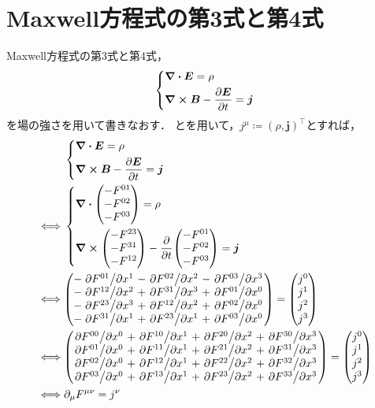 \documentclass{report}
\begin{document}
  \section{Maxwell方程式の第3式と第4式}
    Maxwell方程式の第3式と第4式，
    \begin{align}
      \begin{dcases}
        \div\bm{E} = \rho \\ 
        \curl\bm{B} - \pdv{\bm{E}}{t} = \bm{j} 
      \end{dcases}
    \end{align}
    を場の強さを用いて書きなおす．
    とを用いて，$j^{\mu} \coloneqq (\rho, \bm{j})^{\top}$とすれば，
    \begin{align}
      &\begin{dcases}
        \div\bm{E} = \rho \\ 
        \curl\bm{B} - \pdv{\bm{E}}{t} = \bm{j} 
      \end{dcases} \\ 
      \iff& \begin{dcases}
        \div\mqty(-F^{01} \\ -F^{02} \\ -F^{03}) = \rho \\ 
        \curl\mqty(-F^{23} \\ -F^{31} \\ -F^{12}) - \pdv{t}\mqty(-F^{01} \\ -F^{02} \\ -F^{03}) = \bm{j}
      \end{dcases} \\ 
      \iff& \mqty(
        -\pdv*{F^{01}}{x^1} - \pdv*{F^{02}}{x^2} - \pdv*{F^{03}}{x^3} \\ 
        -\pdv*{F^{12}}{x^2} + \pdv*{F^{31}}{x^3} + \pdv*{F^{01}}{x^0} \\ 
        -\pdv*{F^{23}}{x^3} + \pdv*{F^{12}}{x^2} + \pdv*{F^{02}}{x^0} \\ 
        -\pdv*{F^{31}}{x^1} + \pdv*{F^{23}}{x^1} + \pdv*{F^{03}}{x^0} \\ 
      ) = \mqty(j^0 \\ j^1 \\ j^2 \\ j^3) \\ 
      \iff& \mqty(
        \pdv*{F^{00}}{x^0} + \pdv*{F^{10}}{x^1} + \pdv*{F^{20}}{x^2} + \pdv*{F^{30}}{x^3} \\ 
        \pdv*{F^{01}}{x^0} + \pdv*{F^{11}}{x^1} + \pdv*{F^{21}}{x^2} + \pdv*{F^{31}}{x^3} \\ 
        \pdv*{F^{02}}{x^0} + \pdv*{F^{12}}{x^1} + \pdv*{F^{22}}{x^2} + \pdv*{F^{32}}{x^3} \\ 
        \pdv*{F^{03}}{x^0} + \pdv*{F^{13}}{x^1} + \pdv*{F^{23}}{x^2} + \pdv*{F^{33}}{x^3} \\ 
      ) = \mqty(j^0 \\ j^1 \\ j^2 \\ j^3) \\ 
      \iff& \partial_{\mu}F^{\mu\nu} = j^{\nu} \label{maxwell-3-4-changed}
    \end{align}
\end{document}
